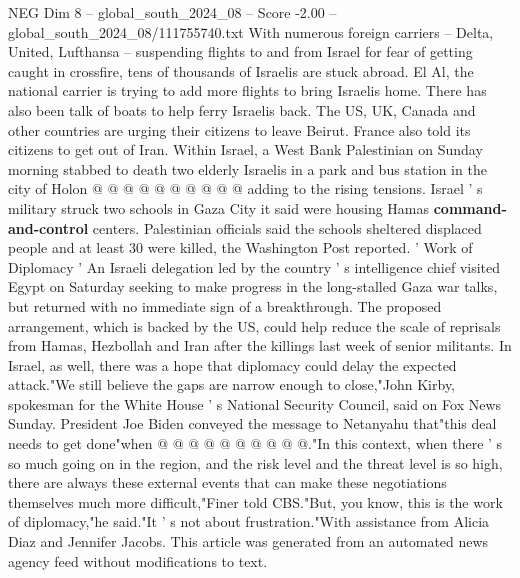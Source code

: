\begin{textsample}{NEG Dim 8 – global\_south\_2024\_08 – Score -2.00 – global\_south\_2024\_08/111755740.txt}
With numerous foreign carriers -- Delta, United, Lufthansa -- suspending flights to and from Israel for fear of getting caught in crossfire, tens of thousands of Israelis are stuck abroad.
El Al, the national carrier is trying to add more flights to bring Israelis home.
There has also been talk of boats to help ferry Israelis back.
The US, UK, Canada and other countries are urging their citizens to leave Beirut.
France also told its citizens to get out of Iran.
Within Israel, a West Bank Palestinian on Sunday morning stabbed to death two elderly Israelis in a park and bus station in the city of Holon @ @ @ @ @ @ @ @ @ @ adding to the rising tensions.
Israel ' s military struck two schools in Gaza City it said were housing Hamas \textbf{command-and-control} centers.
Palestinian officials said the schools sheltered displaced people and at least 30 were killed, the Washington Post reported. ' Work of Diplomacy ' An Israeli delegation led by the country ' s intelligence chief visited Egypt on Saturday seeking to make progress in the long-stalled Gaza war talks, but returned with no immediate sign of a breakthrough.
The proposed arrangement, which is backed by the US, could help reduce the scale of reprisals from Hamas, Hezbollah and Iran after the killings last week of senior militants.
In Israel, as well, there was a hope that diplomacy could delay the expected attack."We still believe the gaps are narrow enough to close,"John Kirby, spokesman for the White House ' s National Security Council, said on Fox News Sunday.
President Joe Biden conveyed the message to Netanyahu that"this deal needs to get done"when @ @ @ @ @ @ @ @ @ @."In this context, when there ' s so much going on in the region, and the risk level and the threat level is so high, there are always these external events that can make these negotiations themselves much more difficult,"Finer told CBS."But, you know, this is the work of diplomacy,"he said."It ' s not about frustration."With assistance from Alicia Diaz and Jennifer Jacobs.
This article was generated from an automated news agency feed without modifications to text.

\end{textsample}
